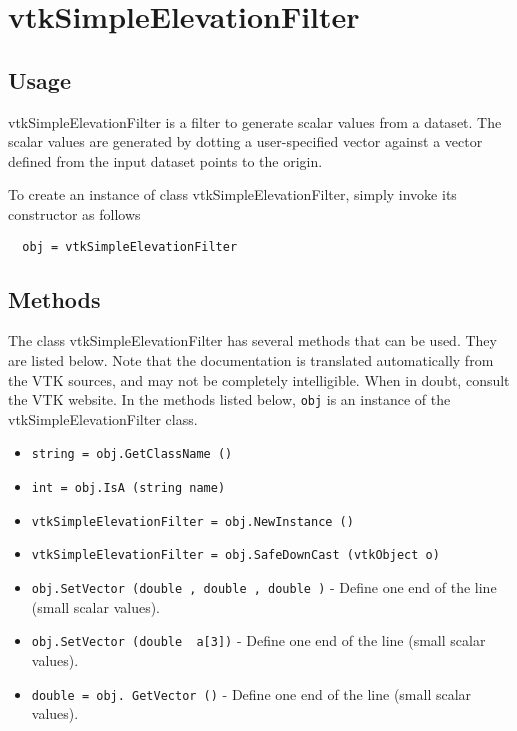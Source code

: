 \section{vtkSimpleElevationFilter}

\subsection{Usage}

 vtkSimpleElevationFilter is a filter to generate scalar values from a
 dataset.  The scalar values are generated by dotting a user-specified
 vector against a vector defined from the input dataset points to the
 origin. 

To create an instance of class vtkSimpleElevationFilter, simply
invoke its constructor as follows
\begin{verbatim}
  obj = vtkSimpleElevationFilter
\end{verbatim}
\subsection{Methods}

The class vtkSimpleElevationFilter has several methods that can be used.
  They are listed below.
Note that the documentation is translated automatically from the VTK sources,
and may not be completely intelligible.  When in doubt, consult the VTK website.
In the methods listed below, \verb|obj| is an instance of the vtkSimpleElevationFilter class.
\begin{itemize}
\item  \verb|string = obj.GetClassName ()|

\item  \verb|int = obj.IsA (string name)|

\item  \verb|vtkSimpleElevationFilter = obj.NewInstance ()|

\item  \verb|vtkSimpleElevationFilter = obj.SafeDownCast (vtkObject o)|

\item  \verb|obj.SetVector (double , double , double )| -  Define one end of the line (small scalar values).

\item  \verb|obj.SetVector (double  a[3])| -  Define one end of the line (small scalar values).

\item  \verb|double = obj. GetVector ()| -  Define one end of the line (small scalar values).

\end{itemize}

